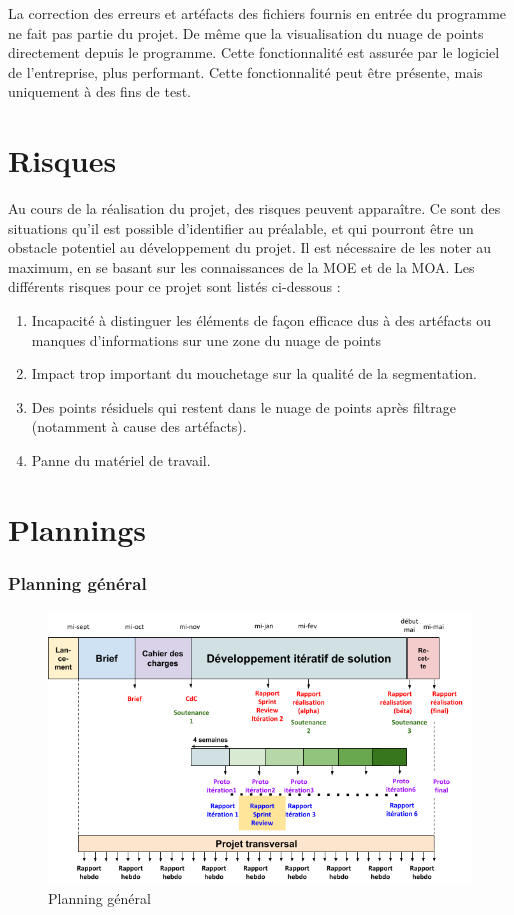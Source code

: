 \documentclass[12pt,titlepage,french]{article}
\begin{document}
La correction des erreurs et artéfacts des fichiers fournis en entrée du programme ne fait pas partie du projet.
De même que la visualisation du nuage de points directement depuis le programme. Cette fonctionnalité est assurée par le logiciel de l'entreprise, plus performant. Cette fonctionnalité peut être présente, mais uniquement à des fins de test.

\section{Risques}

Au cours de la réalisation du projet, des risques peuvent apparaître. Ce sont des situations qu'il est possible d'identifier au préalable, et qui pourront être un obstacle potentiel au développement du projet. Il est nécessaire de les noter au maximum, en se basant sur les connaissances de la MOE et de la MOA. Les différents risques pour ce projet sont listés ci-dessous :
\begin{enumerate}
\item Incapacité à distinguer les éléments de façon efficace dus à des artéfacts ou manques d'informations sur une zone du nuage de points
\item Impact trop important du mouchetage sur la qualité de la segmentation.
\item Des points résiduels qui restent dans le nuage de points après filtrage (notamment à cause des artéfacts).
\item Panne du matériel de travail.
\end{enumerate}

\section{Plannings}
\subsubsection*{Planning général}
\begin{figure} [!hbtp]
 \centering
    \caption{Planning général}
    \label{Planning général}
    \includegraphics[width=\textwidth]{planning.png}
\end{figure}
\end{document}
